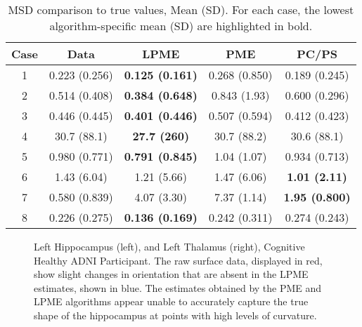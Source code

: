 \documentclass[12pt]{article}
\begin{document}
\begin{table}[h]
  \centering
  \begin{tabular}{|c c c c c|}
    \hline
    Case & Data & LPME & PME & PC/PS \\
    \hline
    1 & 0.223 (0.256) & {\bf 0.125 (0.161)} & 0.268 (0.850) & 0.189 (0.245) \\
    2 & 0.514 (0.408) & {\bf 0.384 (0.648)} & 0.843 (1.93) & 0.600 (0.296) \\
    3 & 0.446 (0.445) & {\bf 0.401 (0.446)} & 0.507 (0.594) & 0.412 (0.423) \\
    4 & 30.7 (88.1) & {\bf 27.7 (260)} & 30.7 (88.2) & 30.6 (88.1) \\
    5 & 0.980 (0.771) & {\bf 0.791 (0.845)} & 1.04 (1.07) & 0.934 (0.713) \\
    6 & 1.43 (6.04) & 1.21 (5.66) & 1.47 (6.06) & {\bf 1.01 (2.11)} \\
    7 & 0.580 (0.839) & 4.07 (3.30) & 7.37 (1.14) & {\bf 1.95 (0.800)} \\
    8 & 0.226 (0.275) & {\bf 0.136 (0.169)} & 0.242 (0.311) & 0.274 (0.243) \\
    \hline
  \end{tabular}
  \caption{MSD comparison to true values, Mean (SD). For each case, the lowest algorithm-specific mean (SD) are highlighted in bold. }
  \label{table:simulation_results_mean}
\end{table}

\begin{figure}
\centering
{}
\vfill
{}
\caption{Left Hippocampus (left), and Left Thalamus (right), Cognitive Healthy ADNI Participant. The raw surface data, displayed in red, show slight changes in orientation that are absent in the LPME estimates, shown in blue. The estimates obtained by the PME and LPME algorithms appear unable to accurately capture the true shape of the hippocampus at points with high levels of curvature.}
\label{fig:adni_result}
\end{figure}
\end{document}
